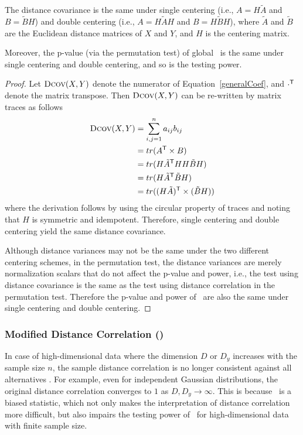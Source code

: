 \documentclass[11pt]{article}
\begin{document}
\begin{lem}
\label{lem1}
The distance covariance is the same under single centering (i.e., $A=H\tilde{A}$ and $B=\tilde{B}H$) and double centering (i.e., $A=H\tilde{A}H$ and $B=H\tilde{B}H$), where $\tilde{A}$ and $\tilde{B}$ are the Euclidean distance matrices of $X$ and $Y$, and $H$ is the centering matrix. 

Moreover, the p-value (via the permutation test) of global \Dcorr~is the same under single centering and double centering, and so is the testing power.
\end{lem}
\begin{proof}
Let ${\normalfont\textsc{Dcov}}(X,Y)$ denote the numerator of Equation~\ref{generalCoef}, and $\cdot^{\mathsf{T}}$ denote the matrix transpose. Then ${\normalfont\textsc{Dcov}}(X,Y)$ can be re-written by matrix traces as follows
\begin{align*}
{\normalfont\textsc{Dcov}}(X,Y) &= \sum_{i,j=1}^{n}a_{ij}b_{ij} \\
 &= tr(A^{\mathsf{T}} \times B) \\
 &= tr(H\tilde{A}^{\mathsf{T}} HH\tilde{B}H) \\
 &= tr(H\tilde{A}^{\mathsf{T}} \tilde{B}H) \\
 &= tr((H\tilde{A})^{\mathsf{T}} \times (\tilde{B}H))
\end{align*}
where the derivation follows by using the circular property of traces and noting that $H$ is symmetric and idempotent. Therefore, single centering and double centering yield the same distance covariance.

Although distance variances may not be the same under the two different centering schemes, in the permutation test, the distance variances are merely normalization scalars that do not affect the p-value and power, i.e., the test using distance covariance is the same as the test using distance correlation in the permutation test. Therefore the p-value and power of \Dcorr~are also the same under single centering and double centering.
\end{proof}

\subsubsection{Modified Distance Correlation (\Mcorr)}
\label{appen:mcorr}
In case of high-dimensional data where the dimension $D$ or $D_y$ increases with the sample size $n$, the sample distance correlation is no longer consistent against all alternatives \cite{SzekelyRizzo2013a}. For example, even for independent Gaussian distributions, the original distance correlation  converges to $1$ as $D, D_y \rightarrow \infty$. This is because \Dcorr~is a biased statistic, 
which not only makes the interpretation of distance correlation more difficult, but also impairs the testing power of \Dcorr~for high-dimensional data with finite sample size.
\end{document}
